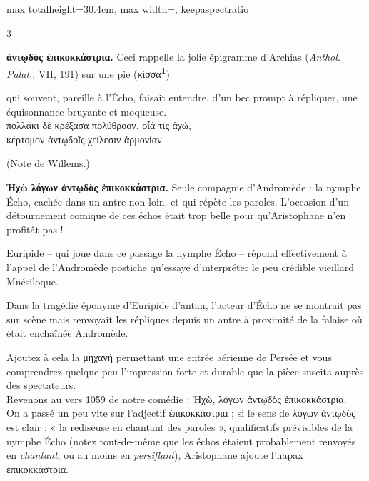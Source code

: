 \documentclass[11pt,twoside]{book}
\newcommand{\italique}[1]{\textit{#1}}
\newcommand{\citComm}[1]{\begin{quoting}[vskip=0.4pt,leftmargin=0.7em,rightmargin=0.2em]#1\end{quoting}}
\newcommand{\marqueur}[1]{\textsuperscript{\color{rubricRed}\textbf{#1}}}
\begin{document}
\begin{adjustbox}{max totalheight=30.4cm, max width=\textwidth, keepaspectratio}
\begin{minipage}{\textwidth}
{\begin{multicols}{3}
\par\vspace{1.5pt}
 \textbf{ἀντῳδὸς ἐπικοκκάστρια.} Ceci rappelle la jolie épigramme d'Archias (\italique{Anthol. Palat.}, VII, 191) sur une pie (κίσσα\marqueur{1})
\citComm{qui souvent, pareille à l'Écho, faisait entendre, d'un bec prompt à répliquer, une équisonnance bruyante et moqueuse.\\
πολλάκι δὲ κρέξασα πολύθροον, οἷά τις ἀχώ,\\
κέρτομον ἀντῳδοῖς χείλεσιν ἁρμονίαν.}
\par\vspace{1.5pt}
\noindent (Note de Willems.)
\par\vspace{1.5pt}
 \textbf{Ἠχὼ λόγων ἀντῳδὸς ἐπικοκκάστρια.} Seule compagnie d'Andromède : la nymphe Écho, cachée dans un antre non loin, et qui répète les paroles. L'occasion d'un détournement comique de ces échos était trop belle pour qu'Aristophane n'en profitât pas !
\par\vspace{1.5pt}
\noindent Euripide – qui joue dans ce passage la nymphe Écho – répond effectivement à l'appel de l'Andromède postiche qu'essaye d'interpréter le peu crédible vieillard Mnésiloque.
\par\vspace{1.5pt}
\noindent Dans la tragédie éponyme d'Euripide d'antan, l'acteur d'Écho ne se montrait pas sur scène mais renvoyait les répliques depuis un antre à proximité de la falaise où était enchaînée Andromède.
\par\vspace{1.5pt}
\noindent Ajoutez à cela la μηχανή permettant une entrée aérienne de Persée et vous comprendrez quelque peu l'impression forte et durable que la pièce suscita auprès des spectateurs.\\ Revenons au vers 1059 de notre comédie : Ἠχὼ, λόγων ἀντῳδὸς ἐπικοκκάστρια.\\ On a passé un peu vite sur l'adjectif ἐπικοκκάστρια ; si le sens de λόγων ἀντῳδὸς est clair : « la rediseuse en chantant des paroles », qualificatifs prévisibles de la nymphe Écho (notez tout-de-même que les échos étaient probablement renvoyés en \italique{chantant}, ou au moins en \italique{persiflant}), Aristophane ajoute l'hapax ἐπικοκκάστρια.
\par\vspace{1.5pt}

\end{multicols}}
\end{minipage}
\end{adjustbox}
\end{document}
